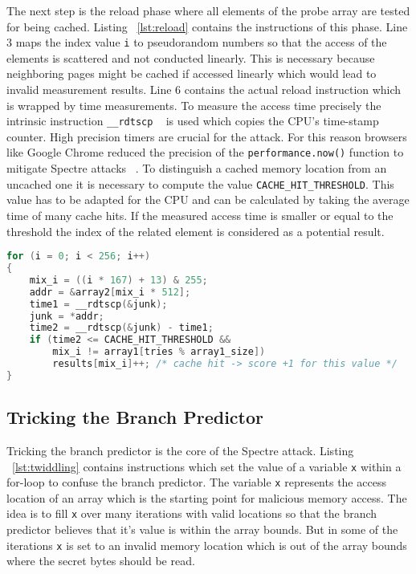 \documentclass[a4paper,oneside,openright] {scrreprt}
\begin{document}
The next step is the reload phase where all elements of the probe array are tested for being cached. 
Listing ~\ref{lst:reload} contains the instructions of this phase. Line 3 maps the index value \texttt{i} to pseudorandom numbers
 so that the access of the elements is scattered and not conducted linearly. 
 This is necessary because neighboring pages might be cached if 
accessed linearly which would lead to invalid measurement results. Line 6 contains the actual reload instruction which is wrapped 
by time measurements.
To measure the access time precisely the intrinsic instruction \texttt{\_\_rdtscp} ~\cite{intelintrinsics} is used which
copies the CPU's time-stamp counter. High precision timers are crucial for the attack. For this reason browsers like 
Google Chrome reduced the precision of the \texttt{performance.now()} function to mitigate Spectre attacks ~\cite{chromeSpectreMeltdown}.
To distinguish a cached memory location from an uncached one it is necessary to compute the value \texttt{CACHE\_HIT\_THRESHOLD}.
This value has to be adapted for the CPU and can be calculated by taking the average time of many cache hits.
If the measured access time is smaller or equal to the threshold the index of the related element is considered as a potential result.

\begin{lstlisting}[language=C, caption=Spectre: Reload, label={lst:reload}]
for (i = 0; i < 256; i++)
{
    mix_i = ((i * 167) + 13) & 255;
    addr = &array2[mix_i * 512];
    time1 = __rdtscp(&junk);
    junk = *addr;
    time2 = __rdtscp(&junk) - time1;
    if (time2 <= CACHE_HIT_THRESHOLD &&
        mix_i != array1[tries % array1_size])
        results[mix_i]++; /* cache hit -> score +1 for this value */
}
\end{lstlisting}

\subsection{Tricking the Branch Predictor}
\label{ch:intro:motivation:A}

Tricking the branch predictor is the core of the Spectre attack. Listing ~\ref{lst:twiddling} contains instructions which
 set the value of a variable \texttt{x} within a for-loop to confuse the branch predictor.
The variable \texttt{x} represents the access location of an array which is the starting point for malicious memory access.
The idea is to fill \texttt{x} over many iterations with valid locations so that the branch predictor believes
that it's value is within the array bounds. But in some of the iterations \texttt{x} is set to an invalid memory location
which is out of the array bounds where the secret bytes should be read.
\end{document}
